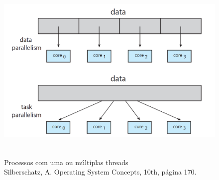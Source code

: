 \begin{figure}[H]
\centering
\includegraphics[keepaspectratio, width=12cm, height=9cm]{imagens/06/06 - data and task parallelism.png}
\caption{Processos com uma ou múltiplas threads  \\
Silberschatz, A. Operating System Concepts, 10th, página 170. \\
}
\label{fig:Processos com uma ou múltiplas threads}
\end{figure}
